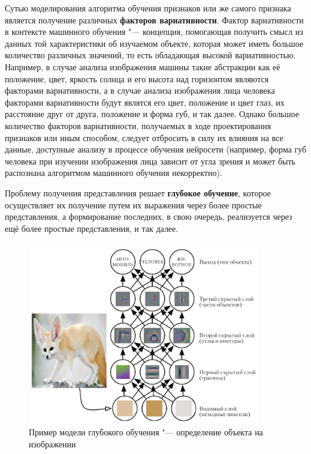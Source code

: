 \documentclass[bachelor, och, coursework]{shiza}
\begin{document}
        Сутью моделирования алгоритма обучения признаков или же самого признака является получение различных \textbf{факторов вариативности}. Фактор вариативности в контексте машинного обучения "--- концепция, помогающая получить смысл из данных той характеристики об изучаемом объекте, которая может иметь большое количество различных значений, то есть обладающая высокой вариативностью. Например, в случае анализа изображения машины такие абстракции как её положение, цвет, яркость солнца и его высота над горизонтом являются факторами вариативности, а в случае анализа изображения лица человека факторами вариативности будут являтся его цвет, положение и цвет глаз, их расстояние друг от друга, положение и форма губ, и так далее. Однако большое количество факторов вариативности, получаемых в ходе проектирования признаков или иным способом, следует отбросить в силу их влияния на все данные, доступные анализу в процессе обучения нейросети (например, форма губ человека при изучении изображения лица зависит от угла зрения и может быть распознана алгоритмом машинного обучения некорректно).

        Проблему получения представления решает \textbf{глубокое обучение}, которое осуществляет их получение путем их выражения через более простые представления, а формирование последних, в свою очередь, реализуется через ещё более простые представления, и так далее.

        \begin{figure}[H]
            \centering
            \includegraphics[width=0.9\textwidth]{pic/1.png}
            \caption{Пример модели глубокого обучения "--- определение объекта на изображении}
            \label{fig:img1}
        \end{figure}
\end{document}
